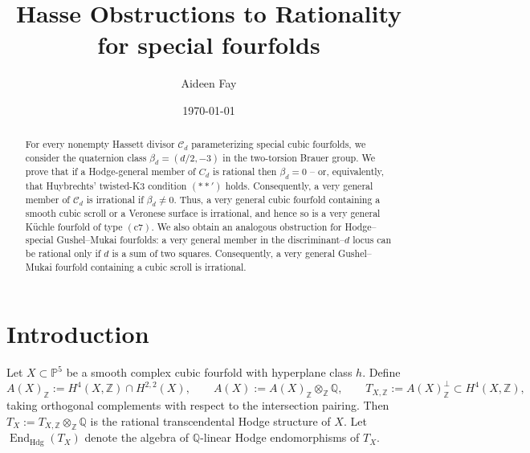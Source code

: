 \documentclass[10pt]{amsart}
\title{Hasse Obstructions to Rationality for special fourfolds}
\author{Aideen Fay}
\date{\today}
\numberwithin{equation}{section}
\theoremstyle{definition}
\theoremstyle{plain}
\numberwithin{theorem}{section}
\def\PP{{\mathbb{P}}}
\def\ZZ{{\mathbb{Z}}}
\newcommand{\Q}{\mathbb{Q}}
\newcommand{\Z}{\mathbb{Z}}
\newcommand{\End}{\operatorname{End}}
\begin{document}
\begin{abstract}
For every nonempty Hassett divisor $\mathcal C_d$ parameterizing special cubic fourfolds, we consider the quaternion class $\beta_d=(d/2,-3)$ in the two-torsion Brauer group. We prove that if a Hodge-general member of ${C}_d$ is rational then $\beta_d=0$ -- or, equivalently, that Huybrechts' twisted-K3 condition $(**')$ holds. Consequently, a very general member of $\mathcal C_d$ is irrational if $\beta_d\ne0$. Thus, a very general cubic fourfold containing a smooth cubic scroll or a Veronese surface is irrational, and hence so is a very general K\"uchle fourfold of type $(\mathrm{c7})$. We also obtain an analogous obstruction for Hodge--special Gushel--Mukai fourfolds: a very general member in the discriminant--$d$ locus can be rational only if $d$ is a sum of two squares.  Consequently, a very general Gushel--Mukai fourfold containing a cubic scroll is irrational.
\end{abstract}
\maketitle


\section{Introduction}
Let \(X\subset \PP^5\) be a smooth complex cubic fourfold with hyperplane class $h$. Define
\[
A(X)_{\Z}:=H^4(X,\Z)\cap H^{2,2}(X),\qquad
A(X) := A(X)_\ZZ \otimes_{\Z} \Q, \qquad
T_{X,\Z}
  :=A(X)_{\Z}^{\perp}\subset H^4(X,\Z),
\]
taking orthogonal complements with respect to the intersection pairing. Then $T_X:=T_{X,\Z}\otimes_{\Z}\mathbb Q$ is the rational transcendental Hodge structure of $X$. Let $\End_{\mathrm{Hdg}}(T_{X})$ denote the algebra of $\Q$-linear Hodge endomorphisms of $T_{X}$.
\end{document}
